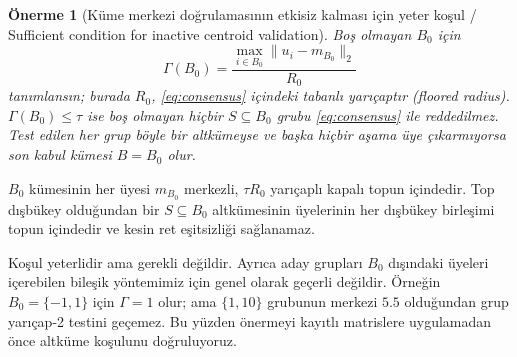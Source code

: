 \documentclass[journal]{IEEEtran}
\newtheorem{proposition}{Önerme}
\begin{document}
\begin{proposition}[Küme merkezi doğrulamasının etkisiz kalması için yeter koşul / Sufficient condition for inactive centroid validation]\label{prop:vacuity}
Boş olmayan $B_0$ için
\[
\Gamma(B_0)=\frac{\max_{i\in B_0}\|u_i-m_{B_0}\|_2}{R_0}
\]
tanımlansın; burada $R_0$, \eqref{eq:consensus} içindeki tabanlı yarıçaptır (floored radius). $\Gamma(B_0)\leq\tau$ ise boş olmayan hiçbir $S\subseteq B_0$ grubu \eqref{eq:consensus} ile reddedilmez. Test edilen her grup böyle bir altkümeyse ve başka hiçbir aşama üye çıkarmıyorsa son kabul kümesi $B=B_0$ olur.
\end{proposition}
\begin{IEEEproof}
$B_0$ kümesinin her üyesi $m_{B_0}$ merkezli, $\tau R_0$ yarıçaplı kapalı topun içindedir. Top dışbükey olduğundan bir $S\subseteq B_0$ altkümesinin üyelerinin her dışbükey birleşimi topun içindedir ve kesin ret eşitsizliği sağlanamaz.
\end{IEEEproof}
Koşul yeterlidir ama gerekli değildir. Ayrıca aday grupları $B_0$ dışındaki üyeleri içerebilen bileşik yöntemimiz için genel olarak geçerli değildir. Örneğin $B_0=\{-1,1\}$ için $\Gamma=1$ olur; ama $\{1,10\}$ grubunun merkezi $5.5$ olduğundan grup yarıçap-2 testini geçemez. Bu yüzden önermeyi kayıtlı matrislere uygulamadan önce altküme koşulunu doğruluyoruz.
\end{document}

